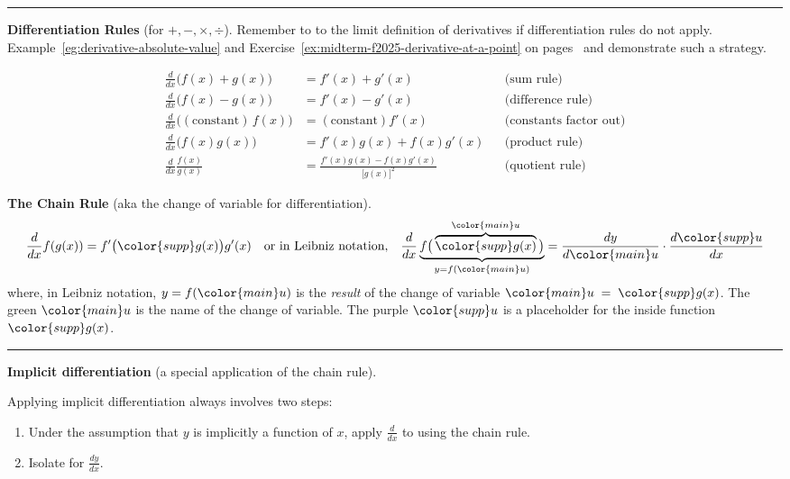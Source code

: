 \documentclass[../main.tex]{subfiles}
\begin{document}
\hrule
\textbf{Differentiation Rules} (for \(+, -, \times, \div\)). \qquad
{\footnotesize \faExclamationTriangle{} Remember to  to the limit definition of derivatives if differentiation rules do not apply. Example~\ref{eg:derivative-absolute-value} and Exercise~\ref{ex:midterm-f2025-derivative-at-a-point} on pages~\pageref{eg:derivative-absolute-value} and \pageref{ex:midterm-f2025-derivative-at-a-point} demonstrate such a strategy.}

\begin{align*}
  \frac{d}{dx} \bigg(f(x) + g(x)\bigg) &= f'(x) + g'(x) &&\text{(sum rule)} \\[2ex]
  \frac{d}{dx} \bigg(f(x) - g(x)\bigg) &= f'(x) - g'(x) &&\text{(difference rule)}\\[2ex]
  \frac{d}{dx} \bigg((\text{constant}) \, f(x)\bigg)  &= (\text{constant}) f'(x) && \text{(constants factor out)}\\[2ex]
  \frac{d}{dx} \bigg(f(x) g(x)\bigg)  &= f'(x)g(x) + f(x)g'(x) &&\text{(product rule)}\\[2ex]
  \frac{d}{dx} \frac{f(x)}{g(x)}  &= \frac{f'(x)g(x) - f(x)g'(x)}{\big[g(x)\big]^{2}} && \text{(quotient rule)}
\end{align*}
\clearpage

\textbf{The Chain Rule} (aka the change of variable for differentiation).
\[
  \frac{d}{dx} f(g(x)) = f'\big({\color{supp}g(x)}\big)g'(x)
  \quad\text{or in Leibniz notation,}\quad
  \frac{d}{dx} \underbrace{f\big(\overbrace{\color{supp}g(x)}^{{\color{main}u}}\big)}_{y = f({\color{main}u})}
  = \frac{dy}{d{\color{main}u}} \cdot \frac{d{\color{supp}u}}{dx}
\]
where, in Leibniz notation, \(y = f({\color{main}u})\) is the \emph{result} of the change of variable \({\color{main}u} \;=\; {\color{supp}g(x)}\).
The green \({\color{main}u}\) is the name of the change of variable. The purple \({\color{supp}u}\) is a placeholder for the inside function \({\color{supp}g(x)}\).

\medskip
\hrule

\textbf{Implicit differentiation} (a special application of the chain rule).


Applying implicit differentiation always involves two steps:
\begin{enumerate}
  \item Under the assumption that \(y\) is implicitly a function of \(x\), apply \(\frac{d}{dx}\) to  using the chain rule.
  \item Isolate for \(\frac{dy}{dx}\).
\end{enumerate}
\end{document}
